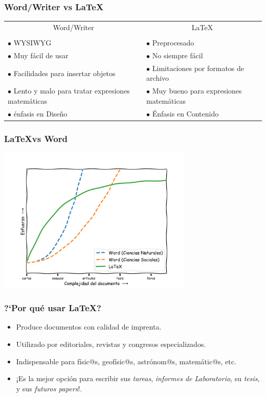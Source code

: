 \documentclass[colorlinks,aspectratio=169]{beamer}
\begin{document}
\begin{frame}[fragile]\frametitle{Word/Writer vs \LaTeX}
\begin{center}
\begin{tabular}{p{}p{}}
\multicolumn{1}{c}{Word/Writer	}     & \multicolumn{1}{c}{\LaTeX}      \\
\\

$\bullet$ WYSIWYG            & $\bullet$ Preprocesado          \\
$\bullet$ Muy fácil de usar & $\bullet$ No siempre fácil     \\
$\bullet$ Facilidades para insertar objetos 
                             & $\bullet$ Limitaciones por formatos de archivo \\[1ex]
$\bullet$ Lento y malo para tratar expresiones matemáticas
                             & $\bullet$ Muy bueno para expresiones matemáticas \\
$\bullet$ énfasis en Dise\~no & $\bullet$ Énfasis en Contenido         
\end{tabular}
\end{center}
\end{frame}

\begin{frame}[fragile]\frametitle{\LaTeX vs Word}
\begin{center}
	\includegraphics[height=7cm]{figs/LaTeX_vs_Word-2.pdf}
\end{center}
\end{frame}

\begin{frame}[fragile]\frametitle{?`Por qué usar \LaTeX?}
\begin{itemize}
\item Produce documentos con calidad de imprenta.
\item Utilizado por editoriales, revistas y congresos especializados.
\item Indispensable para físic@s, geofísic@s, astrónom@s, matemátic@s, etc.
\item ¡Es la mejor opción para escribir sus \textit{tareas}, \textit{informes de Laboratorio}, su \emph{tesis}, y sus \textit{futuros papers}!.
\end{itemize}
\end{frame}
\end{document}
